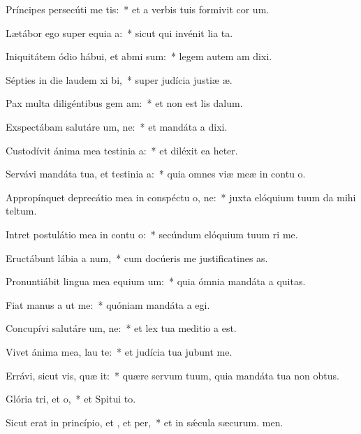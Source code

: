 \item Príncipes persecúti  me tis:~* et a verbis tuis formivit cor um.
\item Lætábor ego super equia a:~* sicut qui invénit lia ta.
\item Iniquitátem ódio hábui, et abmi sum:~* legem autem am dixi.
\item Sépties in die laudem xi bi,~* super judícia justiæ æ.
\item Pax multa diligéntibus gem am:~* et non est lis dalum.
\item Exspectábam salutáre um, ne:~* et mandáta a dixi.
\item Custodívit ánima mea testinia a:~* et diléxit ea heter.
\item Servávi mandáta tua, et testinia a:~* quia omnes viæ meæ in contu o.
\item Appropínquet deprecátio mea in conspéctu o, ne:~* juxta elóquium tuum da mihi teltum.
\item Intret postulátio mea in contu o:~* secúndum elóquium tuum ri me.
\item Eructábunt lábia a num,~* cum docúeris me justificatines as.
\item Pronuntiábit lingua mea equium um:~* quia ómnia mandáta a quitas.
\item Fiat manus a ut  me:~* quóniam mandáta a egi.
\item Concupívi salutáre um, ne:~* et lex tua meditio a est.
\item Vivet ánima mea,  lau te:~* et judícia tua jubunt me.
\item Errávi, sicut vis, quæ it:~* quære servum tuum, quia mandáta tua non  obtus.
\item Glória tri, et o,~* et Spitui to.
\item Sicut erat in princípio, et , et per,~* et in sǽcula sæcurum. men.
